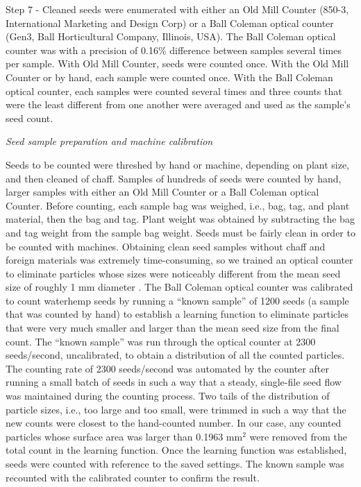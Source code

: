 \documentclass[
]{article}
\begin{document}
Step 7 - Cleaned seeds were enumerated with either an Old Mill Counter (850-3, International Marketing and Design Corp) or a Ball Coleman optical counter (Gen3, Ball Horticultural Company, Illinois, USA). The Ball Coleman optical counter was with a precision of 0.16\% difference between samples several times per sample. With Old Mill Counter, seeds were counted once. With the Old Mill Counter or by hand, each sample were counted once. With the Ball Coleman optical counter, each samples were counted several times and three counts that were the least different from one another were averaged and used as the sample's seed count.

\emph{Seed sample preparation and machine calibration}

Seeds to be counted were threshed by hand or machine, depending on plant size, and then cleaned of chaff.
Samples of hundreds of seeds were counted by hand, larger samples with either an Old Mill Counter or a Ball Coleman optical Counter. Before counting, each sample bag was weighed, i.e., bag, tag, and plant material, then the bag and tag.
Plant weight was obtained by subtracting the bag and tag weight from the sample bag weight.
Seeds must be fairly clean in order to be counted with machines.
Obtaining clean seed samples without chaff and foreign materials was extremely time-consuming, so we trained an optical counter to eliminate particles whose sizes were noticeably different from the mean seed size of roughly 1 mm diameter \citep{bellTimeRequirementPollination2010}.
The Ball Coleman optical counter was calibrated to count waterhemp seeds by running a ``known sample'' of 1200 seeds (a sample that was counted by hand) to establish a learning function to eliminate particles that were very much smaller and larger than the mean seed size from the final count.
The ``known sample'' was run through the optical counter at 2300 seeds/second, uncalibrated, to obtain a distribution of all the counted particles.
The counting rate of 2300 seeds/second was automated by the counter after running a small batch of seeds in such a way that a steady, single-file seed flow was maintained during the counting process.
Two tails of the distribution of particle sizes, i.e., too large and too small, were trimmed in such a way that the new counts were closest to the hand-counted number.
In our case, any counted particles whose surface area was larger than 0.1963 mm\(^2\) were removed from the total count in the learning function.
Once the learning function was established, seeds were counted with reference to the saved settings.
The known sample was recounted with the calibrated counter to confirm the result.
\end{document}
